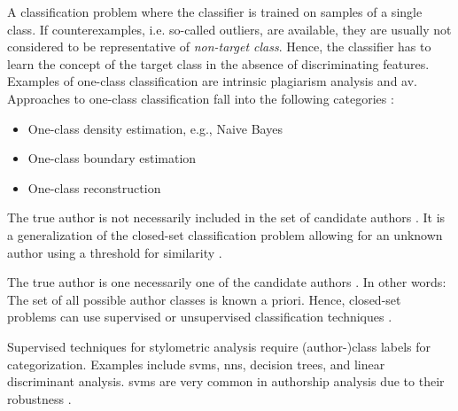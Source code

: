 \begin{definition}
    A classification problem where the classifier is trained on samples of a single class.
    If counterexamples, i.e. so-called outliers, are available, they are usually not considered to be representative of \textit{non-target class}.
    Hence, the classifier has to learn the concept of the target class in the absence of discriminating features.
    Examples of one-class classification are intrinsic plagiarism analysis and \ac{av}.
    Approaches to one-class classification fall into the following categories \cite{stein_intrinsic_2011}:
    \begin{itemize}
        \item One-class density estimation, e.g., Naive Bayes
        \item One-class boundary estimation
        \item One-class reconstruction
    \end{itemize}
\end{definition}

\begin{definition}
    The true author is not necessarily included in the set of candidate authors \cite{stamatatos_survey_2009,barlas_cross_domain_2020,neal_surveying_2018}.
    It is a generalization of the closed-set classification problem allowing for an unknown author using a threshold for similarity \cite{neal_surveying_2018}.
\end{definition}

\begin{definition}
    The true author is one necessarily one of the candidate authors \cite{stamatatos_survey_2009,koppel_authorship_2011,barlas_cross_domain_2020,boenninghoff_o2d2_2021,neal_surveying_2018}.
    In other words: The set of all possible author classes is known a priori.
    Hence, closed-set problems can use supervised or unsupervised classification techniques \cite{abbasi_writeprints_2008}.
\end{definition}

\begin{definition}
    Supervised techniques for stylometric analysis require (author-)class labels for categorization.
    Examples include \acp{svm}, \acp{nn}, decision trees, and linear discriminant analysis.
    \acp{svm} are very common in authorship analysis due to their robustness \cite{abbasi_writeprints_2008}.
\end{definition}


